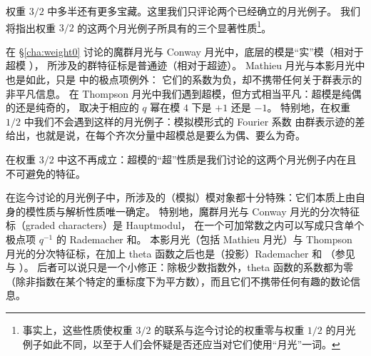 权重 $3/2$ 中多半还有更多宝藏。这里我们只评论两个已经确立的月光例子。
我们将指出权重 $3/2$ 的这两个月光例子所具有的三个显著性质\footnote{事实上，这些性质使权重 $3/2$ 的联系与迄今讨论的权重零与权重 $1/2$ 的月光例子如此不同，以至于人们会怀疑是否还应当对它们使用“月光”一词。}。



在 \S\ref{cha:weight0} 讨论的魔群月光与 Conway 月光中，底层的模是“实”模（相对于超模 ），
所涉及的群特征标是普通迹（相对于超迹）。
Mathieu 月光与本影月光中也是如此，只是  中的极点项例外：
它们的系数为负，却不携带任何关于群表示的非平凡信息。
在 Thompson 月光中我们遇到超模，但方式相当平凡：超模是纯偶的还是纯奇的，
取决于相应的 $q$ 幂在模 $4$ 下是 $+1$ 还是 $-1$。
特别地，在权重 $1/2$ 中我们不会遇到这样的月光例子：模拟模形式的 Fourier 系数
由群表示迹的差给出，也就是说，在每个齐次分量中超模总是要么为偶、要么为奇。


在权重 $3/2$ 中这不再成立：超模的“超”性质是我们讨论的这两个月光例子内在且不可避免的特征。


在迄今讨论的月光例子中，所涉及的（模拟）模对象都十分特殊：它们本质上由自身的模性质与解析性质唯一确定。
特别地，魔群月光与 Conway 月光的分次特征标（graded characters）是 Hauptmodul，
在一个可加常数之内可以写成只含单个极点项 $q^{-1}$ 的 Rademacher 和。
本影月光（包括 Mathieu 月光）与 Thompson 月光的分次特征标，在加上 theta 函数之后也是（投影）Rademacher 和
（参见  与 \cite{cheng2018weight}）。
后者可以说只是一个小修正：除极少数指数外，theta 函数的系数都为零
（除非指数在某个特定的重标度下为平方数），而且它们不携带任何有趣的数论信息。


